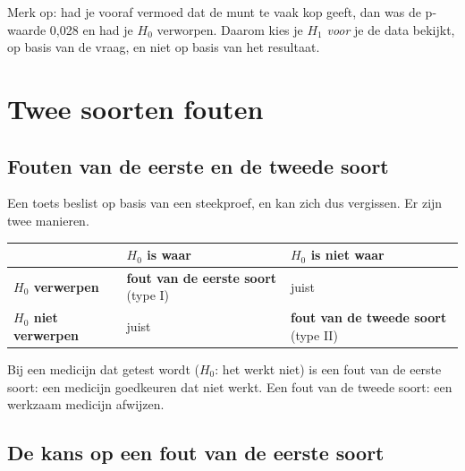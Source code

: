 Merk op: had je vooraf vermoed dat de munt te vaak kop geeft, dan was de p-waarde 0,028 en had je $H_0$ verworpen. Daarom kies je $H_1$ \textit{voor} je de data bekijkt, op basis van de vraag, en niet op basis van het resultaat.

\begin{oefeningen}

\end{oefeningen}

\section{Twee soorten fouten}

\subsection{Fouten van de eerste en de tweede soort}

Een toets beslist op basis van een steekproef, en kan zich dus vergissen. Er zijn twee manieren.

\begin{theorie}
{\centering{}\renewcommand{\arraystretch}{1.6}%
\begin{tabular}{|>{\centering\arraybackslash}m{3.6cm}|>{\centering\arraybackslash}m{4.4cm}|>{\centering\arraybackslash}m{4.4cm}|}
\hline
 & \textbf{$H_0$ is waar} & \textbf{$H_0$ is niet waar} \\ \hline
\textbf{$H_0$ verwerpen} & \textbf{\textcolor{accent}{fout van de eerste soort}} (type I) & juist \\ \hline
\textbf{$H_0$ niet verwerpen} & juist & \textbf{\textcolor{accent}{fout van de tweede soort}} (type II) \\ \hline
\end{tabular}\par}
\end{theorie}

Bij een medicijn dat getest wordt ($H_0$: het werkt niet) is een fout van de eerste soort: een medicijn goedkeuren dat niet werkt. Een fout van de tweede soort: een werkzaam medicijn afwijzen.

\begin{oefeningen}
\end{oefeningen}

\subsection{De kans op een fout van de eerste soort}

